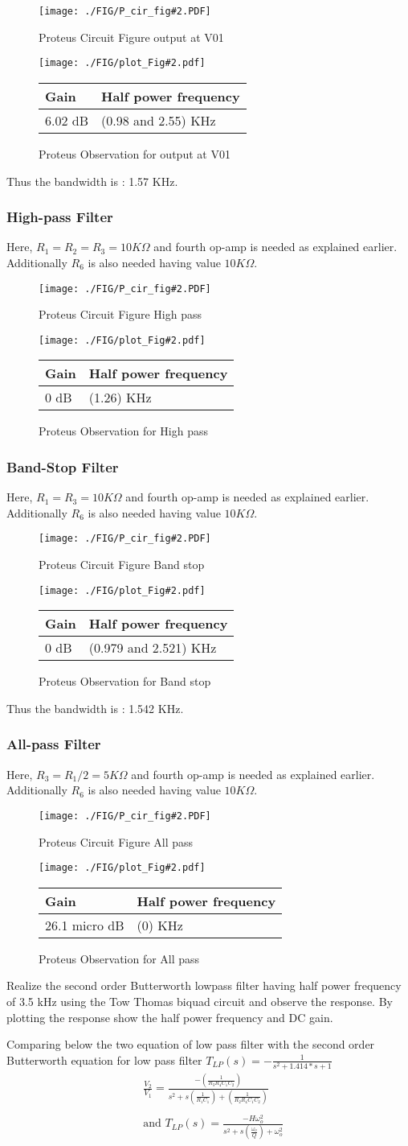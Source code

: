 \documentclass[a4paper,11pt]{article}
\newcommand\ddfrac[2]{\frac{\displaystyle #1}{\displaystyle #2}}
\newcommand{\Porcirobs}[4]{
    \begin{figure}[H] %
        \centering
        \texttt{[image: ./FIG/P\_cir\_fig\#2.PDF]}
        \caption{Proteus Circuit Figure #2}
    \end{figure}



    \begin{figure}[H]  %
        \centering
        \texttt{[image: ./FIG/plot\_Fig\#2.pdf]}
        \begin{tabular}[H]{| m{12em}| m{20em}|}
            \hline
            \rowcolor[rgb]{0.569,0.647,0.947} \textbf{Gain } & \textbf{Half power frequency} \\ \hline
            #3 dB         & (#4) KHz     \\  \hline
        \end{tabular}
        \caption{Proteus Observation for #2}
    \end{figure}
}
\begin{document}
\Porcirobs{0.85}{output at V01}{6.02}{0.98 and 2.55}
Thus the bandwidth is : 1.57 KHz.

\subsubsection*{High-pass Filter}

Here, $R_1=R_2=R_3=10K\Omega$ and fourth op-amp is needed as explained earlier. Additionally $R_6$ is also needed having value $10K\Omega$.
\Porcirobs{0.85}{High pass}{0}{1.26}

\subsubsection*{Band-Stop Filter}

Here, $R_1=R_3=10K\Omega$ and fourth op-amp is needed as explained earlier. Additionally $R_6$ is also needed having value $10K\Omega$.
\Porcirobs{0.85}{Band stop}{0}{0.979 and 2.521}
Thus the bandwidth is : 1.542 KHz.


\subsubsection*{All-pass Filter}


Here, $R_3=R_1/2=5K\Omega$ and fourth op-amp is needed as explained earlier. Additionally $R_6$ is also needed having value $10K\Omega$.
\Porcirobs{0.85}{All pass}{26.1 micro}{0}





\begin{Q}
    {
        Realize the second order Butterworth lowpass filter having half power frequency of 3.5 kHz using the Tow Thomas biquad circuit and observe the response. By plotting the response show the half power frequency and DC gain.
    }
\end{Q}

Comparing below the two equation of low pass filter with the second order Butterworth equation for low pass filter
$T_{LP}(s) = -\ddfrac{1}{s^2+1.414*s+1}$\\


\begin{equation*}
    \begin{aligned}
         & \frac{V_2}{V_1}=\ddfrac{-\left(\frac{1}{R_3R_4C_1C_2}\right)}{s^2+s\left(\frac{1}{R_1C_1}\right)+\left(\frac{1}{R_2R_4C_1C_2}\right)} \\\\
         & \text{and } T_{LP}(s)=\ddfrac{-H\omega_o^2}{s^2+s\left(\frac{\omega_o}{Q}\right)+\omega_o^2}                                          \\
    \end{aligned}
\end{equation*}
\end{document}
